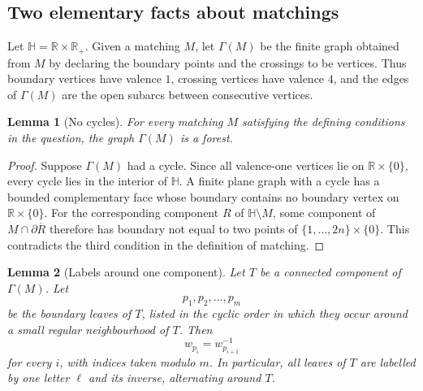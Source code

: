 \documentclass[12pt]{article}
\newtheorem{lemma}{Lemma}
\newcommand{\HH}{\mathbb H}
\newcommand{\bd}{\partial}
\begin{document}
\date{}


\begin{abstract}
We show that the complex \(F_w\) in the question is not always contractible.  We give an explicit reducible quasi-reduced word \(w\) for which \(F_w\) is isomorphic to a two-dimensional cubical complex with nonzero \(H_2\).  In fact, the relevant subcomplex is a cubical cell structure on \(S^2\).
\end{abstract}

\subsection{Two elementary facts about matchings}

Let \(\HH=\mathbb R\times \mathbb R_+\).  Given a matching \(M\), let \(\Gamma(M)\) be the finite graph obtained from \(M\) by declaring the boundary points and the crossings to be vertices.  Thus boundary vertices have valence \(1\), crossing vertices have valence \(4\), and the edges of \(\Gamma(M)\) are the open subarcs between consecutive vertices.

\begin{lemma}[No cycles]\label{lem:forest}
For every matching \(M\) satisfying the defining conditions in the question, the graph \(\Gamma(M)\) is a forest.
\end{lemma}

\begin{proof}
Suppose \(\Gamma(M)\) had a cycle.  Since all valence-one vertices lie on \(\mathbb R\times\{0\}\), every cycle lies in the interior of \(\HH\).  A finite plane graph with a cycle has a bounded complementary face whose boundary contains no boundary vertex on \(\mathbb R\times\{0\}\).  For the corresponding component \(R\) of \(\HH\setminus M\), some component of \(M\cap \bd \overline R\) therefore has boundary not equal to two points of \(\{1,\dots,2n\}\times\{0\}\).  This contradicts the third condition in the definition of matching.
\end{proof}

\begin{lemma}[Labels around one component]\label{lem:cycliclabels}
Let \(T\) be a connected component of \(\Gamma(M)\).  Let
\[
p_1,p_2,\dots,p_m
\]
be the boundary leaves of \(T\), listed in the cyclic order in which they occur around a small regular neighbourhood of \(T\).  Then
\[
w_{p_i}=w_{p_{i+1}}^{-1}
\]
for every \(i\), with indices taken modulo \(m\).  In particular, all leaves of \(T\) are labelled by one letter \(\ell\) and its inverse, alternating around \(T\).
\end{lemma}
\end{document}
